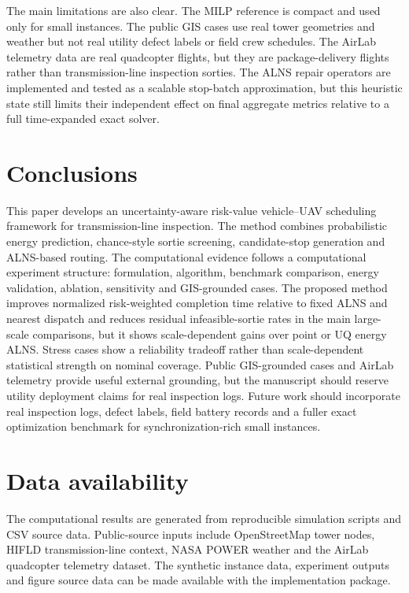 The main limitations are also clear. The MILP reference is compact and used only for small instances. The public GIS cases use real tower geometries and weather but not real utility defect labels or field crew schedules. The AirLab telemetry data are real quadcopter flights, but they are package-delivery flights rather than transmission-line inspection sorties. The ALNS repair operators are implemented and tested as a scalable stop-batch approximation, but this heuristic state still limits their independent effect on final aggregate metrics relative to a full time-expanded exact solver.

\section{Conclusions}
\label{sec:conclusion}

This paper develops an uncertainty-aware risk-value vehicle--UAV scheduling framework for transmission-line inspection. The method combines probabilistic energy prediction, chance-style sortie screening, candidate-stop generation and ALNS-based routing. The computational evidence follows a computational experiment structure: formulation, algorithm, benchmark comparison, energy validation, ablation, sensitivity and GIS-grounded cases. The proposed method improves normalized risk-weighted completion time relative to fixed ALNS and nearest dispatch and reduces residual infeasible-sortie rates in the main large-scale comparisons, but it shows scale-dependent gains over point or UQ energy ALNS. Stress cases show a reliability tradeoff rather than scale-dependent statistical strength on nominal coverage. Public GIS-grounded cases and AirLab telemetry provide useful external grounding, but the manuscript should reserve utility deployment claims for real inspection logs. Future work should incorporate real inspection logs, defect labels, field battery records and a fuller exact optimization benchmark for synchronization-rich small instances.

\section*{Data availability}

The computational results are generated from reproducible simulation scripts and CSV source data. Public-source inputs include OpenStreetMap tower nodes, HIFLD transmission-line context, NASA POWER weather and the AirLab quadcopter telemetry dataset. The synthetic instance data, experiment outputs and figure source data can be made available with the implementation package.

